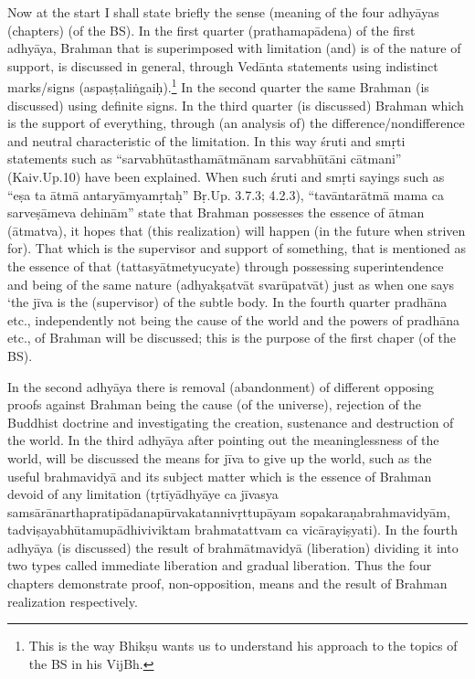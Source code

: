 

Now at the start I shall state briefly the sense (meaning of the four adhyāyas (chapters) (of the BS). In the first quarter (prathamapādena) of the first adhyāya, Brahman that is superimposed with limitation (and) is of the nature of support, is discussed in general, through Vedānta statements using indistinct marks/signs (aspaṣṭaliṅgaiḥ).\footnote{This is the way Bhikṣu wants us to understand his approach to the topics of the BS in his VijBh.} In the second  quarter the same Brahman (is discussed) using definite signs. In the third quarter (is discussed) Brahman which is the support of everything, through (an analysis of) the difference/non\-difference and neutral characteristic of the limitation.  In this way śruti and smṛti statements such as “sarvabhūtasthamātmānam sarvabhūtāni cātmani” (Kaiv.Up.10) have been explained. When such śruti and smṛti sayings such as “eṣa ta ātmā antaryāmyamṛtaḥ” Bṛ.Up. 3.7.3; 4.2.3), “tavāntarātmā mama ca sarveṣāmeva dehinām” state that Brahman possesses the essence of ātman (ātmatva), it hopes that (this realization) will happen (in the future when striven for). That which is the supervisor and support of something, that is mentioned as the essence of that (tattasyātmetyucyate) through possessing superintendence and being of the same nature (adhyakṣatvāt svarūpatvāt) just as when one says ‘the jīva is the (supervisor) of the subtle body. In the fourth quarter pradhāna etc., independently not being the cause of the world and the powers of pradhāna etc., of Brahman will be discussed; this is the purpose of the first chaper (of the BS). 

In the second adhyāya there is removal (abandonment) of different opposing proofs against Brahman being the cause (of the universe), rejection of the Buddhist doctrine and investigating the creation, sustenance and destruction of the world. In the third adhyāya after pointing out the meaninglessness of the world, will be discussed the means for jīva to give up the world, such as the useful brahmavidyā and its subject matter which is the essence of Brahman devoid of any limitation (tṛtīyādhyāye ca jīvasya samsārānarthapratipādanapūrvakatannivṛttupāyam sopakaraṇabrahmavidyām, tadviṣayabhūtamupādhivi\-viktam brahmatattvam ca vicārayiṣyati). In the fourth adhyāya (is discussed) the result of brahmātmavidyā (liberation) dividing it into two types called immediate liberation and gradual liberation. Thus the four chapters demonstrate proof, non-opposition, means and the result of Brahman realization respectively.

